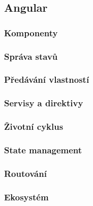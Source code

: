 \subsection{Angular}

\subsubsection{Komponenty}

\subsubsection{Správa stavů}

\subsubsection{Předávání vlastností}

\subsubsection{Servisy a direktivy}

\subsubsection{Životní cyklus}

\subsubsection{State management}

\subsubsection{Routování}

\subsubsection{Ekosystém}